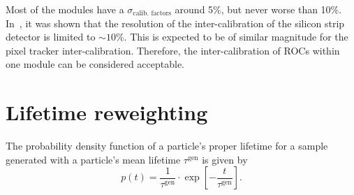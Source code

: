 Most of the modules have a $\sigma_{\text{calib. factors}}$ around 5\%, but never worse than 10\%.
In~\cite{bib:Quertenmont_2010}, it was shown that the resolution of the inter-calibration of the silicon strip detector is limited to $\sim 10\%$.
This is expected to be of similar magnitude for the pixel tracker inter-calibration.
Therefore, the inter-calibration of ROCs within one module can be considered acceptable.

\clearpage
\FloatBarrier
\section{Lifetime reweighting}
\label{app:LifetimeReweighting}
The probability density function of a particle's proper lifetime for a sample generated with a particle's mean lifetime $\tau^{\text{gen}}$ is given by
\begin{equation*}
p \left( t \right) = \frac{1}{\tau^{\text{gen}}} \cdot \exp\left[ -\frac{t}{\tau^{\text{gen}}} \right].
\end{equation*}

